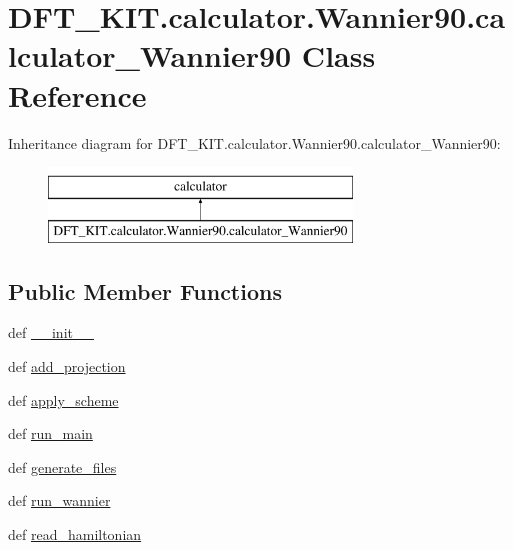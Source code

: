 \hypertarget{class_d_f_t___k_i_t_1_1calculator_1_1_wannier90_1_1calculator___wannier90}{\section{D\+F\+T\+\_\+\+K\+I\+T.\+calculator.\+Wannier90.\+calculator\+\_\+\+Wannier90 Class Reference}
\label{class_d_f_t___k_i_t_1_1calculator_1_1_wannier90_1_1calculator___wannier90}
}
Inheritance diagram for D\+F\+T\+\_\+\+K\+I\+T.\+calculator.\+Wannier90.\+calculator\+\_\+\+Wannier90\+:\begin{figure}[H]
\begin{center}
\leavevmode
\includegraphics[height=2.000000cm]{class_d_f_t___k_i_t_1_1calculator_1_1_wannier90_1_1calculator___wannier90}
\end{center}
\end{figure}
\subsection*{Public Member Functions}
\begin{DoxyCompactItemize}
\item 
def \hyperlink{class_d_f_t___k_i_t_1_1calculator_1_1_wannier90_1_1calculator___wannier90_a74a7bbb9cae9f82ecbca0cc40980d10e}{\+\_\+\+\_\+init\+\_\+\+\_\+}
\item 
def \hyperlink{class_d_f_t___k_i_t_1_1calculator_1_1_wannier90_1_1calculator___wannier90_a7b4a65524bb0a912f03d3fdbe9813bf7}{add\+\_\+projection}
\item 
def \hyperlink{class_d_f_t___k_i_t_1_1calculator_1_1_wannier90_1_1calculator___wannier90_a16a225c3f0ebca12e4bb8299321d425a}{apply\+\_\+scheme}
\item 
def \hyperlink{class_d_f_t___k_i_t_1_1calculator_1_1_wannier90_1_1calculator___wannier90_aaff180b1ad9f56ce24d2063931eabcc2}{run\+\_\+main}
\item 
def \hyperlink{class_d_f_t___k_i_t_1_1calculator_1_1_wannier90_1_1calculator___wannier90_a8a6d0629564467fa5595aa75a9857bbd}{generate\+\_\+files}
\item 
def \hyperlink{class_d_f_t___k_i_t_1_1calculator_1_1_wannier90_1_1calculator___wannier90_af791da89001cc173855be20c09097166}{run\+\_\+wannier}
\item 
def \hyperlink{class_d_f_t___k_i_t_1_1calculator_1_1_wannier90_1_1calculator___wannier90_a3015ae1b54f5fb07f10d4574f2a528db}{read\+\_\+hamiltonian}
\end{DoxyCompactItemize}
